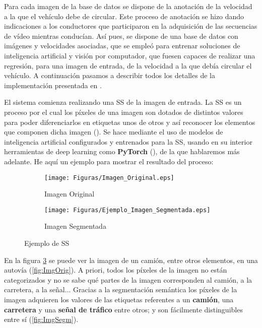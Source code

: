 
Para cada imagen de la base de datos se dispone de la anotación de la velocidad a la que el vehículo debe de circular. Este proceso de anotación se hizo dando indicaciones a los conductores que participaron en la adquisición de las secuencias de vídeo mientras conducían. Así pues, se dispone de una base de datos con imágenes y velocidades asociadas, que se empleó para entrenar soluciones de inteligencia artificial y visión por computador, que fuesen capaces de realizar una regresión, para una imagen de entrada, de la velocidad a la que debía circular el vehículo. A continuación pasamos a describir todos los detalles de la implementación presentada en \cite{isa2}.

El sistema comienza realizando una \ac{SS} de la imagen de entrada. La \ac{SS} es un proceso por el cual los píxeles de una imagen son dotados de distintos valores para poder diferenciarlos en etiquetas unos de otros y así reconocer los elementos que componen dicha imagen (\cite{deeplab}). Se hace mediante el uso de modelos de inteligencia artificial configurados y entrenados para la \ac{SS}, usando en su interior herramientas de deep learning como \textbf{PyTorch} (\cite{pytorch}), de la que hablaremos más adelante. He aquí un ejemplo para mostrar el resultado del proceso:

\begin{figure}[H]
  \centering
  \begin{subfigure}[b]{0.45\linewidth}
    \texttt{[image: Figuras/Imagen\_Original.eps]}
    \caption{Imagen Original}
    \label{fig:Original}
  \end{subfigure}
    \begin{subfigure}[b]{0.5\linewidth}
    \texttt{[image: Figuras/Ejemplo\_Imagen\_Segmentada.eps]}
    \caption{Imagen Segmentada}
    \label{fig:Segmentada}
  \end{subfigure}
  \caption{Ejemplo de \ac{SS}}
  \label{fig:SS}
\end{figure}

En la figura \ref{fig:SS} se puede ver la imagen de un camión, entre otros elementos, en una autovía (\ref{fig:ImgOrig}). A priori, todos los píxeles de la imagen no están categorizados y no se sabe qué partes de la imagen corresponden al camión, a la carretera, a la señal... Gracias a la segmentación semántica los píxeles de la imagen adquieren los valores de las etiquetas referentes a un \textbf{camión}, una \textbf{carretera} y una \textbf{señal de tráfico} entre otros; y son fácilmente distinguibles entre sí (\ref{fig:ImgSegm}). 

